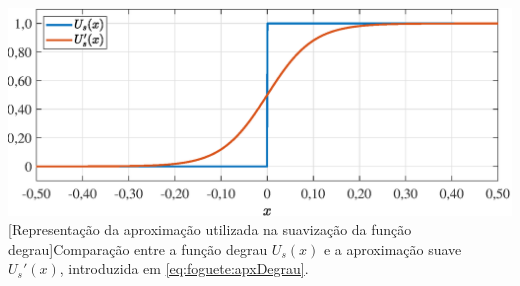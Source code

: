 \noindent	
\begin{minipage}{\textwidth}
	\vspace{\onelineskip}
	\centering
	\includegraphics[width=1\linewidth]{fig/resultados/foguete/obs/apxDegrau}
	[Representação da aproximação utilizada na suavização da função degrau]{Comparação entre a função degrau $ U_s(x) $ e a aproximação suave $ U_s'(x) $, introduzida em \eqref{eq:foguete:apxDegrau}.}
	\label{fig:foguete:aproximacaoDegrau}
	\vspace{\onelineskip}
\end{minipage}
